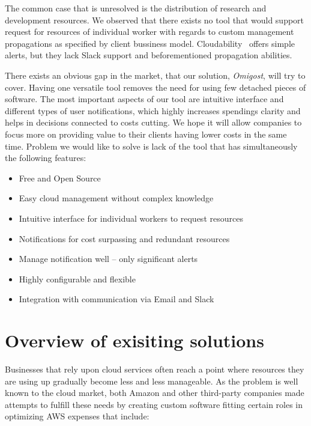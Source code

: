 \documentclass[licencjacka,en]{thesisclass}
\begin{document}
    The common case that is unresolved is the distribution of research and development resources.
    We observed that there exists no tool that would support request for resources of individual worker with regards to custom management propagations as specified by client bussiness model.
    Cloudability~\cite{CloudabilityAlerts} offers simple alerts, but they lack Slack support and beforementioned propagation abilities.

    There exists an obvious gap in the market, that our solution, \textit{Omigost}, will try to cover.
    Having one versatile tool removes the need for using few detached pieces of software.
    The most important aspects of our tool are intuitive interface and different types of user notifications, which highly increases spendings clarity and helps in decisions connected to costs cutting.
    We hope it will allow companies to focus more on providing value to their clients having lower costs in the same time.
    Problem we would like to solve is lack of the tool that has simultaneously the following features:
    \begin{itemize}
        \item Free and Open Source
        \item Easy cloud management without complex knowledge
        \item Intuitive interface for individual workers to request resources
        \item Notifications for cost surpassing and redundant resources
        \item Manage notification well -- only significant alerts
        \item Highly configurable and flexible
        \item Integration with communication via Email and Slack
    \end{itemize}

    \section{Overview of exisiting solutions}

    Businesses that rely upon cloud services often reach a point where resources
    they are using up gradually become less and less manageable.
    As the problem is well known to the cloud market, both Amazon and other third-party companies made attempts
    to fulfill these needs by creating custom software fitting certain roles in optimizing AWS expenses that include:
\end{document}

